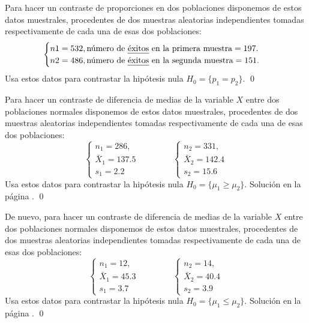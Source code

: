 \documentclass[10pt,a4paper]{article}\usepackage[]{graphicx}\usepackage[]{color}
\newcounter {cont01}
\begin{document}
{\begin{ejercicio}
\label{tut09:ejercicio06}

Para hacer un contraste de proporciones en dos poblaciones disponemos de estos datos muestrales, procedentes de dos muestras aleatorias independientes tomadas respectivamente de cada una de esas dos poblaciones:
\[
\begin{cases}
n1=532, \mbox{número de {\em éxitos} en la primera muestra} = 197.\\
n2=486, \mbox{número de {\em éxitos} en la segunda muestra} = 151.\\
\end{cases}
\]
Usa estos datos para contrastar la hipótesis nula $H_0=\{p_1 = p_2\}$.
\qed
\end{ejercicio}

\begin{ejercicio}
\label{tut09:ejercicio07}








Para hacer un contraste de diferencia de medias de la variable $X$ entre dos poblaciones normales disponemos de estos datos muestrales, procedentes de dos muestras aleatorias independientes tomadas respectivamente de cada una de esas dos poblaciones:
\[
\begin{cases}
n_1 = 286,\\
{\bar X}_1 = 137.5\\
s_1 = 2.2
\end{cases}
\qquad\qquad
\begin{cases}
n_2 = 331,\\
{\bar X}_2 = 142.4\\
s_2 = 15.6
\end{cases}
\]
Usa estos datos para contrastar la hipótesis nula $H_0=\{\mu_1 \geq \mu_2 \}$.
Solución en la página \pageref{tut09:ejercicio07:sol}.
\qed
\end{ejercicio}


\begin{ejercicio}
\label{tut09:ejercicio08}




De nuevo, para hacer un contraste de diferencia de medias de la variable $X$ entre dos poblaciones normales disponemos de estos datos muestrales, procedentes de dos muestras aleatorias independientes tomadas respectivamente de cada una de esas dos poblaciones:
\[
\begin{cases}
n_1 = 12,\\
{\bar X}_1 = 45.3\\
s_1 = 3.7
\end{cases}
\qquad\qquad
\begin{cases}
n_2 = 14,\\
{\bar X}_2 = 40.4\\
s_2 = 3.9
\end{cases}
\]
Usa estos datos para contrastar la hipótesis nula $H_0=\{\mu_1 \leq \mu_2 \}$.
Solución en la página \pageref{tut09:ejercicio08:sol}.
\qed
\end{ejercicio}


}
\end{document}
